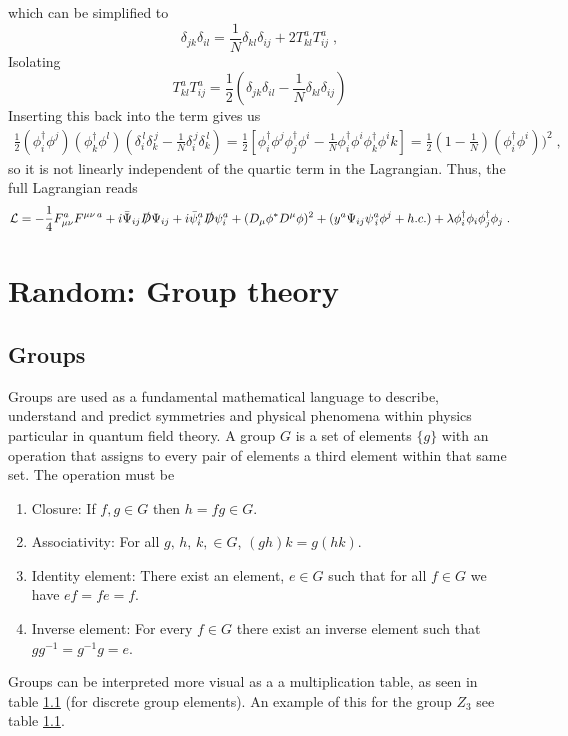 which can be simplified to 
\begin{equation}
      \delta_{jk}\delta_{il}=\frac{1}{N} \delta_{kl}\delta_{ij}+2T^a_{kl}T^a_{ij}\;,
\end{equation}
Isolating 
\begin{equation}
      T^a_{kl}T^a_{ij}=\frac{1}{2}\left(\delta_{jk}\delta_{il}-\frac{1}{N} \delta_{kl}\delta_{ij}\right)
\end{equation}
Inserting this back into the term gives us
\begin{align}
    \frac{1}{2} (\phi_i^\dagger \phi^j)(\phi_k^\dagger \phi^l)\left(\delta_i^{\,l}\delta_k^{\,j}-\frac{1}{N}\delta_i^{\,j}\delta_k^{\,l}\right)=\frac{1}{2}\left[\phi^{\dagger}_i \phi^j \phi^{\dagger}_j \phi^i-\frac{1}{N}\phi^{\dagger}_i \phi^i \phi^{\dagger}_k \phi^ik\right]=\frac{1}{2}\left(1-\frac{1}{N}\right) (\phi^{\dagger}_i \phi^i))^2\;,
\end{align}
so it is not linearly independent of the quartic term in the Lagrangian. Thus, the full Lagrangian reads
\begin{equation}
    \mathcal{L}= -\frac{1}{4} F_{\mu\nu}^a F^{\mu\nu\,a}+i \bar \Psi_{ij}\slashed{D}\Psi_{ij}+i \bar \psi_i^a\slashed{D}\psi_i^a+(D_\mu \phi^*D^\mu\phi)^2+(y^a\Psi_{ij} \psi ^a_{\, i} \phi^j + h.c.)+\lambda \phi^\dagger_i \phi_i \phi^\dagger_j \phi_j 
    \;.
\end{equation}
\section{Random: Group theory}
\subsection{Groups}
Groups are used as a fundamental mathematical language to describe, understand and predict symmetries and physical phenomena within physics particular in quantum field theory. A group $G$  is a set of elements $\{g\}$ with an operation that assigns to every pair of elements a third element within that same set. The operation must be 
\begin{enumerate}
    \item Closure: If $f,g \in G$ then $h=fg\in G$.
    \item Associativity: For all $g,\,h,\,k,\in G$, $(gh)k=g(hk)$.
    \item Identity element: There exist an element, $e\in G$ such that for all $f\in G$ we have $ef=fe=f$.
    \item Inverse element: For every $f\in G$ there exist an inverse element such that $gg^{-1}=g^{-1}g=e$.
\end{enumerate}
Groups can be interpreted more visual as a a multiplication table, as seen in table \ref{} (for discrete group elements). An example of this for the group $Z_3$ see table \ref{}.

